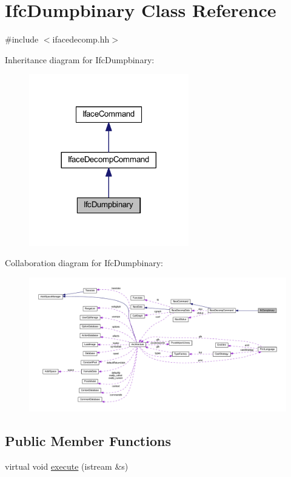 \hypertarget{class_ifc_dumpbinary}{}\section{Ifc\+Dumpbinary Class Reference}
\label{class_ifc_dumpbinary}


{\ttfamily \#include $<$ifacedecomp.\+hh$>$}



Inheritance diagram for Ifc\+Dumpbinary\+:
\nopagebreak
\begin{figure}[H]
\begin{center}
\leavevmode
\includegraphics[width=197pt]{class_ifc_dumpbinary__inherit__graph}
\end{center}
\end{figure}


Collaboration diagram for Ifc\+Dumpbinary\+:
\nopagebreak
\begin{figure}[H]
\begin{center}
\leavevmode
\includegraphics[width=350pt]{class_ifc_dumpbinary__coll__graph}
\end{center}
\end{figure}
\subsection*{Public Member Functions}
\begin{DoxyCompactItemize}
\item 
virtual void \mbox{\hyperlink{class_ifc_dumpbinary_a1a4fb5637d0c8792ed2aaf7615f7da00}{execute}} (istream \&s)
\end{DoxyCompactItemize}
